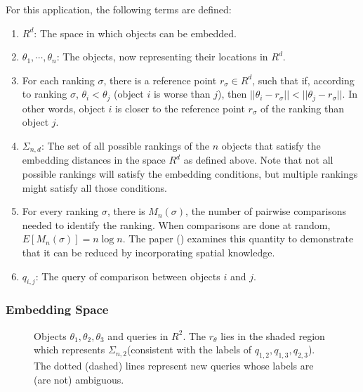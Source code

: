 \documentclass[
  letterpaper,
  numbers=noenddot,
  DIV=11]{scrreprt}
\theoremstyle{plain}
\theoremstyle{definition}
\theoremstyle{plain}
\theoremstyle{remark}
\begin{document}
For this application, the following terms are defined:

\begin{enumerate}
\def\labelenumi{\arabic{enumi}.}
\item
  \textbf{\(R^d\)}: The space in which objects can be embedded.
\item
  \textbf{\(\theta_1, \cdots,\theta_n\)}: The objects, now representing
  their locations in \(R^d\).
\item
  For each ranking \(\sigma\), there is a reference point
  \(r_{\sigma} \in R^d\), such that if, according to ranking \(\sigma\),
  \(\theta_{i} < \theta_{j}\) (object \(i\) is worse than \(j\)), then
  \(||\theta_i - r_{\sigma}|| < ||\theta_j - r_{\sigma}||\). In other
  words, object \(i\) is closer to the reference point \(r_{\sigma}\) of
  the ranking than object \(j\).
\item
  \textbf{\(\Sigma_{n,d}\)}: The set of all possible rankings of the
  \(n\) objects that satisfy the embedding distances in the space
  \(R^d\) as defined above. Note that not all possible rankings will
  satisfy the embedding conditions, but multiple rankings might satisfy
  all those conditions.
\item
  For every ranking \(\sigma\), there is \(M_n(\sigma)\), the number of
  pairwise comparisons needed to identify the ranking. When comparisons
  are done at random, \(E[M_n(\sigma)] = n\log n\). The paper
  () examines this quantity
  to demonstrate that it can be reduced by incorporating spatial
  knowledge.
\item
  \textbf{\(q_{i,j}\)}: The query of comparison between objects \(i\)
  and \(j\).
\end{enumerate}

\subsubsection*{Embedding Space}\label{embedding-space}

\begin{figure}


\caption{\label{fig-dim-space}Objects \(\theta_1, \theta_2, \theta_3\)
and queries in \(R^2\). The \(r_\theta\) lies in the shaded region which
represents \(\Sigma_{n,2}\)(consistent with the labels of
\(q_{1,2}, q_{1,3}, q_{2,3}\)). The dotted (dashed) lines represent new
queries whose labels are (are not) ambiguous.}

\end{figure}%
\end{document}
